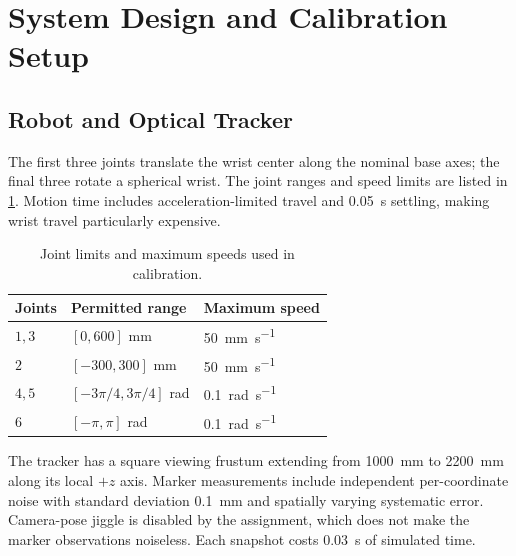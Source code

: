 \documentclass[11pt,letterpaper]{article}
\begin{document}
\section{System Design and Calibration Setup}\label{sec:design}
\subsection{Robot and Optical Tracker}
The first three joints translate the wrist center along the nominal base axes; the final three rotate a spherical wrist. The joint ranges and speed limits are listed in \cref{tab:joint_limits}. Motion time includes acceleration-limited travel and \SI{0.05}{\second} settling, making wrist travel particularly expensive.
\begin{table}[!htbp]\centering
\caption{Joint limits and maximum speeds used in calibration.}\label{tab:joint_limits}
\begin{tabular}{@{}lll@{}}\toprule
Joints & Permitted range & Maximum speed\\\midrule
$1,3$ & $[0,600]$ mm & \SI{50}{\milli\metre\per\second}\\
$2$ & $[-300,300]$ mm & \SI{50}{\milli\metre\per\second}\\
$4,5$ & $[-3\pi/4,3\pi/4]$ rad & \SI{0.1}{\radian\per\second}\\
$6$ & $[-\pi,\pi]$ rad & \SI{0.1}{\radian\per\second}\\\bottomrule
\end{tabular}
\end{table}

The tracker has a square viewing frustum extending from \SI{1000}{\milli\metre} to \SI{2200}{\milli\metre} along its local $+z$ axis. Marker measurements include independent per-coordinate noise with standard deviation \SI{0.1}{\milli\metre} and spatially varying systematic error. Camera-pose jiggle is disabled by the assignment, which does not make the marker observations noiseless. Each snapshot costs \SI{0.03}{\second} of simulated time.
\end{document}
